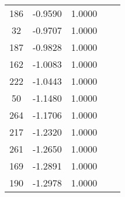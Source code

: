 \documentclass[12pt]{article}\usepackage[]{graphicx}\usepackage[]{color}
\begin{document}
\begin{longtable}[c]{ccccc}
	186	& -0.9590 & 1.0000 & & \\
	32	& -0.9707 & 1.0000 & & \\
	187	& -0.9828 & 1.0000 & & \\
	162	& -1.0083 & 1.0000 & & \\
	222	& -1.0443 & 1.0000 & & \\
	50	& -1.1480 & 1.0000 & & \\
	264	& -1.1706 & 1.0000 & & \\
	217	& -1.2320 & 1.0000 & & \\
	261	& -1.2650 & 1.0000 & & \\
	169	& -1.2891 & 1.0000 & & \\
	190	& -1.2978 & 1.0000 & & \\
\end{longtable}
\end{document}
